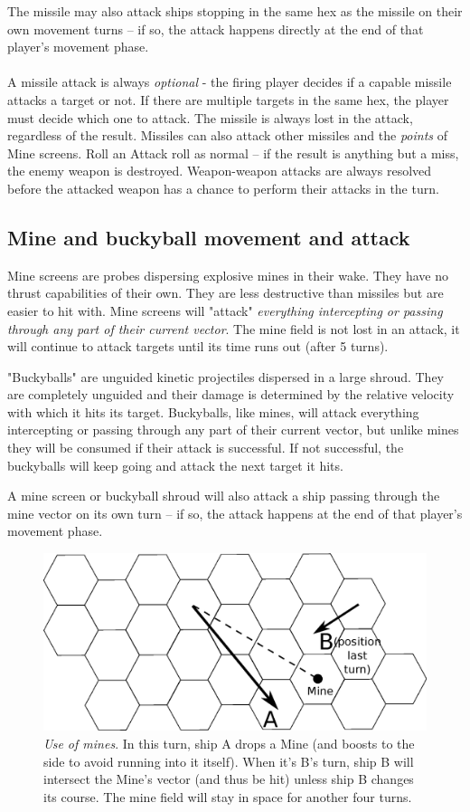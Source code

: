 \documentclass[a4paper,12pt,notitlepage,twocolumn]{article}
\begin{document}
The missile may also attack ships stopping in the same hex as the missile
on their own movement turns -- if so, the attack happens directly
at the end of that player's movement phase. 
\\\\
A missile attack is always \emph{optional} - the firing player decides if a capable 
missile attacks a target or not. If there are multiple targets in the same hex, the player 
must decide which one to attack. The missile is always lost in the attack, regardless
of the result.  
Missiles can also attack other missiles and the \emph{points} of Mine screens. Roll
an Attack roll as normal -- if the result is anything but a miss, the enemy weapon is
destroyed. Weapon-weapon attacks are always resolved before the attacked weapon has a chance to 
perform their attacks in the turn.  

\subsection{Mine and buckyball movement and attack}
\label{sec:mine_screen_movement_and_attack}
Mine screens are probes dispersing explosive mines in their
wake. They have no thrust capabilities of their own. They are less
destructive than missiles but are easier to hit with. Mine screens
will "attack" \emph{everything intercepting or passing through any
part of their current vector}. The mine field is not lost in an attack,
it will continue to attack targets until its time runs out (after 5 turns). 

"Buckyballs" are unguided kinetic projectiles dispersed in a large shroud.
They are completely unguided and their damage is determined by the relative
velocity with which it hits its target. Buckyballs, like mines, will attack
everything intercepting or passing through any part of their current vector, 
but unlike mines they will be consumed if their attack is successful. If 
not successful, the buckyballs will keep going and attack the next target it 
hits. 

A mine screen or buckyball shroud will also attack a ship passing  through the mine vector on its own turn -- if so,
the attack happens at the end of that player's movement phase. 

\begin{figure}[h!]\centering 
  \includegraphics[width=0.5 \textwidth]{data/combat_1.eps}
  \caption{\footnotesize \emph{Use of mines}. In this turn,
    ship A drops a Mine (and boosts to the side to avoid 
    running into it itself). When it's B's turn, ship B will
    intersect the Mine's vector (and thus be hit) unless ship B
    changes its course. The mine field will stay in space for 
    another four turns.}
\label{fig:10}
\end{figure}
\end{document}
